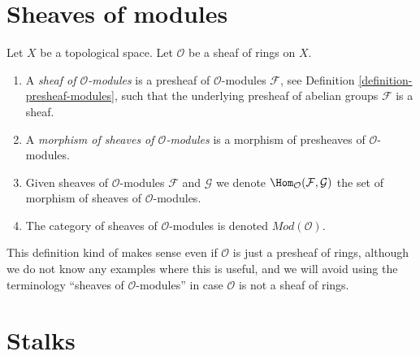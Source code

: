 \section{Sheaves of modules}
\label{section-sheaves-modules}

\begin{definition}
\label{definition-sheaf-modules}
Let $X$ be a topological space.
Let $\mathcal{O}$ be a sheaf of rings on $X$.
\begin{enumerate}
\item A {\it sheaf of $\mathcal{O}$-modules} is a presheaf
of $\mathcal{O}$-modules $\mathcal{F}$,
see Definition \ref{definition-presheaf-modules},
such that the underlying presheaf of abelian groups $\mathcal{F}$
is a sheaf.
\item A {\it morphism of sheaves of $\mathcal{O}$-modules}
is a morphism of presheaves of $\mathcal{O}$-modules.
\item Given sheaves of $\mathcal{O}$-modules
$\mathcal{F}$ and $\mathcal{G}$ we denote
$\Hom_\mathcal{O}(\mathcal{F}, \mathcal{G})$
the set of morphism of sheaves of $\mathcal{O}$-modules.
\item The category of sheaves of $\mathcal{O}$-modules
is denoted $\textit{Mod}(\mathcal{O})$.
\end{enumerate}
\end{definition}

\noindent
This definition kind of makes sense even if $\mathcal{O}$ is just a
presheaf of rings, although we do not know any examples where
this is useful, and we will avoid using the terminology
``sheaves of $\mathcal{O}$-modules''
in case $\mathcal{O}$ is not a sheaf of rings.







\section{Stalks}
\label{section-stalks}

